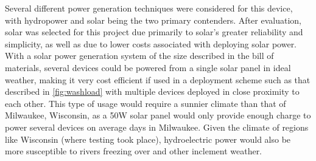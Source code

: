 \documentclass[fleqn,10pt]{SelfArx} %
\begin{document}
	Several different power generation techniques were considered for this device, with hydropower and solar being the two primary contenders. After evaluation, solar was selected for this project due primarily to solar's greater reliability and simplicity, as well as due to lower costs associated with deploying solar power. With a solar power generation system of the size described in the bill of materials, several devices could be powered from a single solar panel in ideal weather, making it very cost efficient if used in a deployment scheme such as that described in \ref{fig:washload} with multiple devices deployed in close proximity to each other. This type of usage would require a sunnier climate than that of Milwaukee, Wisconsin, as a 50W solar panel would only provide enough charge to power several devices on average days in Milwaukee. Given the climate of regions like Wisconsin (where testing took place), hydroelectric power would also be more susceptible to rivers freezing over and other inclement weather. 
	

	
\end{document}
